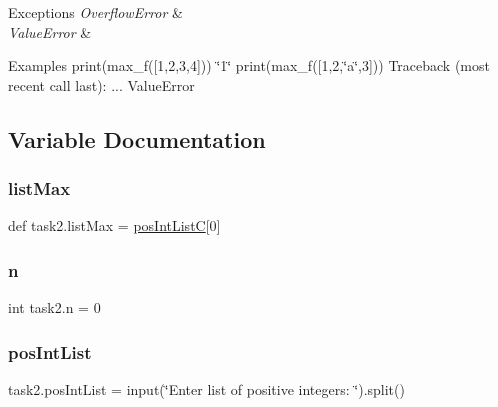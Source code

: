 \begin{DoxyExceptions}{Exceptions}
{\em Overflow\+Error} & \\
\hline
{\em Value\+Error} & \\
\hline
\end{DoxyExceptions}
\begin{DoxyParagraph}{Examples}
print(max\+\_\+f(\mbox{[}1,2,3,4\mbox{]})) \char`\"{}1\char`\"{} print(max\+\_\+f(\mbox{[}1,2,\char`\"{}a\char`\"{},3\mbox{]})) Traceback (most recent call last)\+: ... Value\+Error 
\end{DoxyParagraph}


\subsection{Variable Documentation}
\mbox{\label{namespacetask2_a54615b31e07691d50cd02e39a051576a}} 
\subsubsection{\texorpdfstring{list\+Max}{listMax}}
{\footnotesize\ttfamily def task2.\+list\+Max = \hyperlink{namespacetask2_a019b7ef0f8fda1ddb12b56f3b6585533}{pos\+Int\+ListC}\mbox{[}0\mbox{]}}

\mbox{\label{namespacetask2_a9997b6e0b5925d8fed669755c44c01a6}} 
\subsubsection{\texorpdfstring{n}{n}}
{\footnotesize\ttfamily int task2.\+n = 0}

\mbox{\label{namespacetask2_ae07ebbc4c73946fcc787d1c29614fb12}} 
\subsubsection{\texorpdfstring{pos\+Int\+List}{posIntList}}
{\footnotesize\ttfamily task2.\+pos\+Int\+List = input(\char`\"{}Enter list of positive integers\+: \char`\"{}).split()}

\mbox{\label{namespacetask2_a019b7ef0f8fda1ddb12b56f3b6585533}} 
